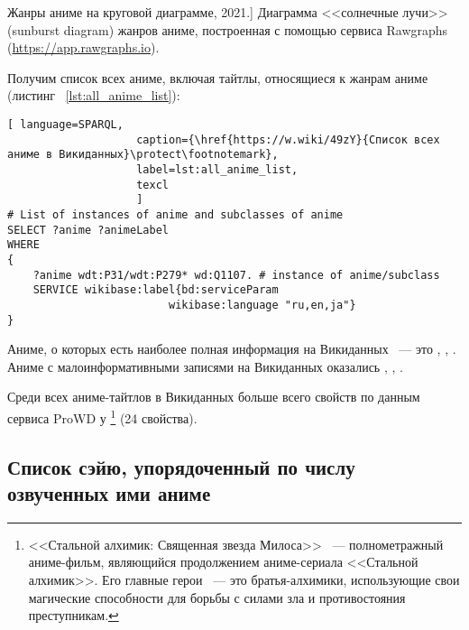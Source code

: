 \begin{marginfigure}[0.0cm]
{
	\setlength{\fboxsep}{0pt}%
	\setlength{\fboxrule}{1pt}%
}
\caption
[Жанры аниме на круговой диаграмме, 2021.]
{
Диаграмма <<солнечные лучи>> (sunburst diagram) жанров аниме, построенная с помощью сервиса Rawgraphs (\href{https://app.rawgraphs.io}{https://app.rawgraphs.io}).\newline
}
\label{fig:anime_piechart}
\end{marginfigure}

Получим список всех аниме, включая тайтлы, относящиеся к жанрам аниме (листинг ~\protect\ref{lst:all_anime_list}):

\begin{lstlisting}[ language=SPARQL, 
                    caption={\href{https://w.wiki/49zY}{Список всех аниме в Викиданных}\protect\footnotemark},
                    label=lst:all_anime_list,
                    texcl 
                    ]
# List of instances of anime and subclasses of anime
SELECT ?anime ?animeLabel
WHERE
{
    ?anime wdt:P31/wdt:P279* wd:Q1107. # instance of anime/subclass
    SERVICE wikibase:label{bd:serviceParam
					     wikibase:language "ru,en,ja"}
}
\end{lstlisting}%

Аниме, о которых есть наиболее полная информация на Викиданных ~--- это , , . Аниме с малоинформативными записями на Викиданных оказались , , .

Среди всех аниме-тайтлов в Викиданных больше всего свойств по данным сервиса ProWD у \footnote{<<Стальной алхимик: Священная звезда Милоса>> ~--- полнометражный аниме-фильм, являющийся продолжением аниме-сериала <<Стальной алхимик>>. Его главные герои ~--- это братья-алхимики, использующие свои магические способности для борьбы с силами зла и противостояния преступникам.} (24 свойства).

\subsection{Список сэйю, упорядоченный по числу озвученных ими аниме}

